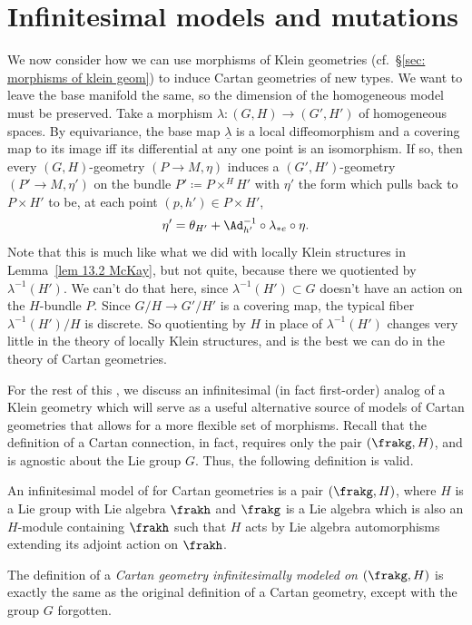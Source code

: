 \section{Infinitesimal models and mutations}


We now consider how we can use morphisms of Klein geometries (cf.\ \S\ref{sec: morphisms of klein geom}) to induce Cartan geometries of new types. We want to leave the base manifold the same, so the dimension of the homogeneous model must be preserved. Take a morphism $\lambda:(G,H)\to (G',H')$ of homogeneous spaces. By equivariance, the base map $\underline{\lambda}$ is a local diffeomorphism and a covering map to its image iff its differential at any one point is an isomorphism. If so, then every $(G,H)$-geometry $(P\to M,\eta)$ induces a $(G',H')$-geometry $(P'\to M,\eta')$ on the bundle $P'\coloneqq P\times^H H'$ with $\eta'$ the form which pulls back to $P\times H'$ to be, at each point $(p,h')\in P\times H'$, 
\[\eta'=\theta_{H'}+\Ad_{h'}^{-1}\circ\lambda_{\ast e}\circ \eta.\]
Note that this is much like what we did with locally Klein structures in Lemma~\ref{lem 13.2 McKay}, but not quite, because there we quotiented by $\lambda^{-1}(H')$. We can't do that here, since $\lambda^{-1}(H')\subset G$ doesn't have an action on the $H$-bundle $P$. Since $G\slash H\to G'\slash H'$ is a covering map, the typical fiber $\lambda^{-1}(H')\slash H$ is discrete. So quotienting by $H$ in place of $\lambda^{-1}(H')$ changes very little in the theory of locally Klein structures, and is the best we can do in the theory of Cartan geometries.


For the rest of this \sect, we discuss an infinitesimal (in fact first-order) analog of a Klein geometry which will serve as a useful alternative source of models of Cartan geometries that allows for a more flexible set of morphisms. Recall that the definition of a Cartan connection, in fact, requires only the pair $(\frakg,H)$, and is agnostic about the Lie group $G$. Thus, the following definition is valid.

\begin{defn}
    An infinitesimal model of for Cartan geometries is a pair $(\frakg,H)$, where $H$ is a Lie group with Lie algebra $\frakh$ and $\frakg$ is a Lie algebra which is also an $H$-module containing $\frakh$ such that $H$ acts by Lie algebra automorphisms extending its adjoint action on $\frakh$. 
\end{defn}

The definition of a \emph{Cartan geometry infinitesimally modeled on $(\frakg,H)$} is exactly the same as the original definition of a Cartan geometry, except with the group $G$ forgotten.

